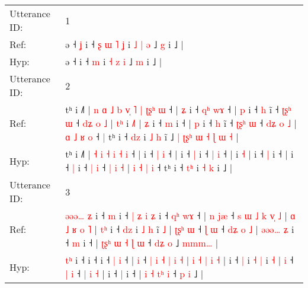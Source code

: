 \documentclass[10pt]{article}
\DeclareRobustCommand{\hl}[1]{{\textcolor{red}{#1}}}
\begin{document}
\begin{longtable}{ll}
\toprule
Utterance ID: & 1 \\
Ref: & ə ˧\hl{ }\hl{ʝ} i ˧\hl{ }\hl{ʂ}\hl{ }\hl{ɯ}\hl{ }\hl{˥} \hl{ʝ} i \hl{˩} \hl{|} \hl{ə} ˩ \hl{g} i ˩ |
 \\
Hyp: & ə ˧\hl{}\hl{} i ˧\hl{}\hl{}\hl{}\hl{}\hl{}\hl{} \hl{m} i \hl{˧} \hl{z} \hl{i} ˩ \hl{m} i ˩ |
 \\
\midrule
Utterance ID: & 2 \\
Ref: & tʰ i ˩˥ |\hl{ }\hl{n}\hl{ }\hl{ɑ}\hl{ }\hl{˩} \hl{b} \hl{v}\hl{̩} \hl{˥} \hl{|} \hl{ʈ}\hl{ʂ}\hl{ʰ} \hl{ɯ} ˧ |\hl{ }\hl{ʑ} i ˧ \hl{q}\hl{ʰ} \hl{w}\hl{ɤ} ˧ |\hl{ }\hl{p} i ˧ \hl{h} i\hl{̃} ˧ \hl{ʈ}\hl{ʂ}\hl{ʰ} \hl{ɯ} ˧\hl{ }\hl{d}\hl{ʑ}\hl{ }\hl{o}\hl{ }\hl{˩} |\hl{ }\hl{t}\hl{ʰ} i \hl{˩}\hl{˥} |\hl{ }\hl{ʑ} i ˧ \hl{m} i ˧ |\hl{ }\hl{p} i ˧ \hl{h} i\hl{̃} ˧ \hl{ʈ}\hl{ʂ}\hl{ʰ} \hl{ɯ} ˧ \hl{d}\hl{ʑ} \hl{o} \hl{˩} | \hl{ɑ} \hl{˩} \hl{ʁ} \hl{o} ˧\hl{ }\hl{|} tʰ i ˧ \hl{d}\hl{z} i \hl{˩} \hl{h} i\hl{̃} ˩\hl{ }\hl{|}\hl{ }\hl{ʈ}\hl{ʂ}\hl{ʰ}\hl{ }\hl{ɯ}\hl{ }\hl{˧}\hl{ }\hl{ɭ}\hl{ }\hl{ɯ}\hl{ }\hl{˧} |
 \\
Hyp: & tʰ i ˩˥ |\hl{}\hl{}\hl{}\hl{}\hl{}\hl{} \hl{˧} \hl{}\hl{i} \hl{˧} \hl{i} \hl{}\hl{}\hl{˧} \hl{i} ˧ |\hl{}\hl{} i ˧ \hl{}\hl{|} \hl{}\hl{i} ˧ |\hl{}\hl{} i ˧ \hl{|} i\hl{} ˧ \hl{}\hl{}\hl{|} \hl{i} ˧\hl{}\hl{}\hl{}\hl{}\hl{}\hl{}\hl{} |\hl{}\hl{}\hl{} i \hl{}\hl{˧} |\hl{}\hl{} i ˧ \hl{|} i ˧ |\hl{}\hl{} i ˧ \hl{|} i\hl{} ˧ \hl{}\hl{}\hl{|} \hl{i} ˧ \hl{}\hl{|} \hl{i} \hl{˧} | \hl{i} \hl{˧} \hl{|} \hl{i} ˧\hl{}\hl{} tʰ i ˧ \hl{t}\hl{ʰ} i \hl{˧} \hl{k} i\hl{} ˩\hl{}\hl{}\hl{}\hl{}\hl{}\hl{}\hl{}\hl{}\hl{}\hl{}\hl{}\hl{}\hl{}\hl{}\hl{}\hl{} |
 \\
\midrule
Utterance ID: & 3 \\
Ref: & \hl{ə}\hl{ə}\hl{ə}\hl{…}\hl{ }\hl{ʑ} i ˧\hl{ }\hl{m} i ˧\hl{ }\hl{|}\hl{ }\hl{ʑ}\hl{ }\hl{i}\hl{ }\hl{ʑ} i ˧ \hl{q}\hl{ʰ} \hl{w}\hl{ɤ} ˧ |\hl{ }\hl{n} \hl{j}\hl{æ} ˧ \hl{s} \hl{ɯ} \hl{˩} \hl{k} \hl{v}\hl{̩} \hl{˩} | \hl{ɑ} \hl{˩} \hl{ʁ} \hl{o} \hl{˥} |\hl{ }\hl{t}\hl{ʰ} i ˧ \hl{d}\hl{z} i \hl{˩} \hl{h} i\hl{̃} \hl{˩} |\hl{ }\hl{ʈ}\hl{ʂ}\hl{ʰ} \hl{ɯ} ˧ \hl{ɭ} \hl{ɯ} ˧ \hl{d}\hl{ʑ} \hl{o} \hl{˩} |\hl{ }\hl{ə}\hl{ə}\hl{ə}\hl{…}\hl{ }\hl{ʑ} i ˧ \hl{m} i ˧ | \hl{ʈ}\hl{ʂ}\hl{ʰ} \hl{ɯ} \hl{˧}\hl{ }\hl{ɭ} \hl{ɯ} ˧ \hl{d}\hl{ʑ} \hl{o} ˩\hl{ }\hl{m}\hl{m}\hl{m}\hl{…} |
 \\
Hyp: & \hl{}\hl{}\hl{}\hl{}\hl{t}\hl{ʰ} i ˧\hl{}\hl{} i ˧\hl{}\hl{}\hl{}\hl{}\hl{}\hl{}\hl{}\hl{} i ˧ \hl{}\hl{|} \hl{}\hl{i} ˧ |\hl{}\hl{} \hl{}\hl{i} ˧ \hl{|} \hl{i} \hl{˧} \hl{|} \hl{}\hl{i} \hl{˧} | \hl{i} \hl{˧} \hl{|} \hl{i} \hl{˧} |\hl{}\hl{}\hl{} i ˧ \hl{}\hl{|} i \hl{˧} \hl{|} i\hl{} \hl{˧} |\hl{}\hl{}\hl{}\hl{} \hl{i} ˧ \hl{|} \hl{i} ˧ \hl{}\hl{|} \hl{i} \hl{˧} |\hl{}\hl{}\hl{}\hl{}\hl{}\hl{}\hl{} i ˧ \hl{|} i ˧ | \hl{}\hl{}\hl{i} \hl{˧} \hl{}\hl{t}\hl{ʰ} \hl{i} ˧ \hl{}\hl{p} \hl{i} ˩\hl{}\hl{}\hl{}\hl{}\hl{} |

\end{longtable}
\end{document}
